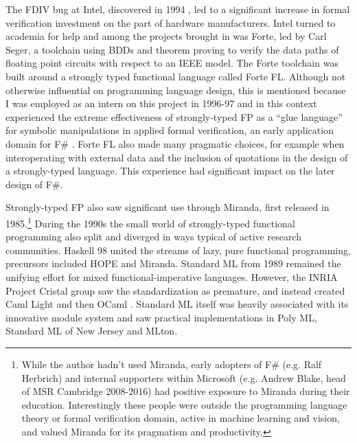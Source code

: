 \documentclass[acmsmall,screen]{acmart}
\begin{document}
The FDIV bug at Intel, discovered in 1994 \citep{FDIV}, led to a
significant increase in formal verification investment on the part of hardware manufacturers. Intel turned to academia for help and among the projects brought
in was Forte, led by Carl Seger, a toolchain using BDDs and theorem proving to verify the data paths of floating point circuits with respect to an IEEE model.
The Forte toolchain was built around a strongly typed functional language called Forte FL. Although not otherwise influential on programming language design, this
is mentioned because I was employed as an intern on this project in 1996-97 and in this context experienced the extreme effectiveness of strongly-typed FP
as a “glue language” for symbolic manipulations in applied formal verification, an early application domain for F\# \citep{Seger2005}. Forte FL also made
many pragmatic choices, for example when interoperating with external data and the inclusion of quotations in the design of a strongly-typed language. This experience
had significant impact on the later design of F\#.

Strongly-typed FP also saw significant use through Miranda, first released in 1985.\footnote{While the author hadn’t used Miranda, early adopters of
F\# (e.g. Ralf Herbrich) and internal supporters within Microsoft (e.g. Andrew Blake, head of MSR Cambridge 2008-2016) had positive exposure to Miranda
during their education. Interestingly these people were outside the programming language theory or formal verification domain, active in machine learning and vision, and
valued Miranda for its pragmatism and productivity.}  During the 1990s the small world of strongly-typed functional programming also split and diverged in ways typical
of active research communities.  Haskell 98 united the streams of lazy, pure functional programming, precursors included HOPE and Miranda.  Standard ML from 1989 remained
the unifying effort for mixed functional-imperative languages. However, the INRIA Project Cristal group saw the standardization as premature, and instead created
Caml Light and then OCaml \citep{Leroy2014}. Standard ML itself was heavily associated with its innovative module system and saw practical implementations in Poly ML, Standard
ML of New Jersey and MLton.
\end{document}
